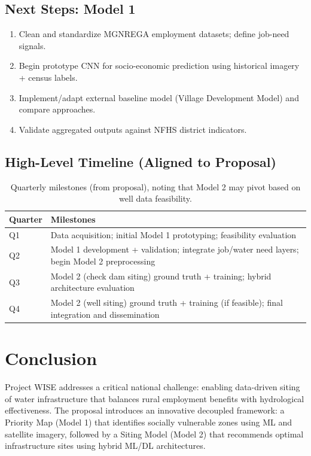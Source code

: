 \documentclass[12pt,a4paper]{report}
\begin{document}
\section{Next Steps: Model 1}
\begin{enumerate}
  \item Clean and standardize MGNREGA employment datasets; define job-need signals.
  \item Begin prototype CNN for socio-economic prediction using historical imagery + census labels.
  \item Implement/adapt external baseline model (Village Development Model) and compare approaches.
  \item Validate aggregated outputs against NFHS district indicators.
\end{enumerate}

\section{High-Level Timeline (Aligned to Proposal)}
\begin{table}[H]
\centering
\begin{tabular}{p{} p{}}
\toprule
\textbf{Quarter} & \textbf{Milestones} \\
\midrule
Q1 & Data acquisition; initial Model 1 prototyping; feasibility evaluation \\
Q2 & Model 1 development + validation; integrate job/water need layers; begin Model 2 preprocessing \\
Q3 & Model 2 (check dam siting) ground truth + training; hybrid architecture evaluation \\
Q4 & Model 2 (well siting) ground truth + training (if feasible); final integration and dissemination \\
\bottomrule
\end{tabular}
\caption{Quarterly milestones (from proposal), noting that Model 2 may pivot based on well data feasibility.}
\end{table}

\chapter{Conclusion}
Project WISE addresses a critical national challenge: enabling data-driven siting of water infrastructure that balances rural employment benefits with hydrological effectiveness. The proposal introduces an innovative decoupled framework: a Priority Map (Model 1) that identifies socially vulnerable zones using ML and satellite imagery, followed by a Siting Model (Model 2) that recommends optimal infrastructure sites using hybrid ML/DL architectures.
\end{document}
